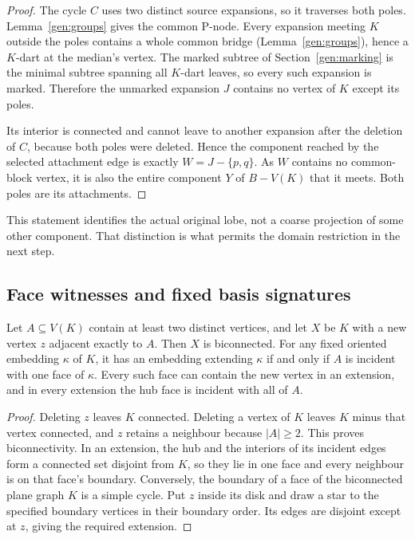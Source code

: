 \begin{proof}
The cycle $C$ uses two distinct source expansions, so it traverses both
poles.  Lemma~\ref{gen:groups} gives the common P-node.  Every expansion
meeting $K$ outside the poles contains a whole common bridge
(Lemma~\ref{gen:groups}), hence a $K$-dart at the median's vertex.  The
marked subtree of Section~\ref{gen:marking} is the minimal subtree spanning
all $K$-dart leaves, so every such expansion is marked.  Therefore the
unmarked expansion $J$ contains no vertex of $K$ except its poles.

Its interior is connected and cannot leave to another expansion after
the deletion of $C$, because both poles were deleted.  Hence the
component reached by the selected attachment edge is exactly
$W=J-\{p,q\}$.  As $W$ contains no common-block vertex, it is also
the entire component $Y$ of $B-V(K)$ that it meets.  Both poles are its
attachments.
\end{proof}

This statement identifies the actual original lobe, not a coarse
projection of some other component.  That distinction is what permits
the domain restriction in the next step.

\subsection{Face witnesses and fixed basis signatures}

\begin{lemma}
\label{gen:hub}
Let $A\subseteq V(K)$ contain at least two distinct vertices, and let
$X$ be $K$ with a new vertex $z$ adjacent exactly to $A$.  Then $X$ is
biconnected.  For any fixed oriented embedding $\kappa$ of $K$, it has
an embedding extending $\kappa$ if and only if $A$ is incident with one
face of $\kappa$.  Every such face can contain the new vertex in an
extension, and in every extension the hub face is incident with all of
$A$.
\end{lemma}

\begin{proof}
Deleting $z$ leaves $K$ connected.  Deleting a vertex of $K$ leaves
$K$ minus that vertex connected, and $z$ retains a neighbour because
$|A|\geq2$.  This proves biconnectivity.  In an extension, the hub and
the interiors of its incident edges form a connected set disjoint from
$K$, so they lie in one face and every neighbour is on that face's
boundary.  Conversely, the boundary of a face of the biconnected plane
graph $K$ is a simple cycle.  Put $z$ inside its disk and draw a star
to the specified boundary vertices in their boundary order.  Its edges
are disjoint except at $z$, giving the required extension.
\end{proof}

